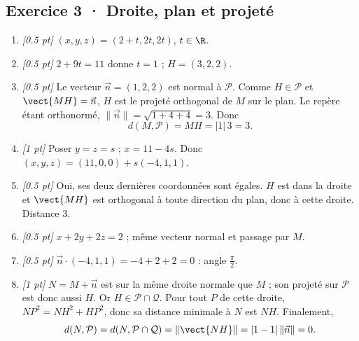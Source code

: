 \subsection*{Exercice 3 · Droite, plan et projeté}\begin{enumerate}

\item \textit{[\num{0,5} pt]} $(x,y,z)=(2+t,2t,2t)$, $t\in\R$.

\item \textit{[\num{0,5} pt]} $2+9t=11$ donne $t=1$ ; $H=(3,2,2)$.

\item \textit{[\num{0,5} pt]} Le vecteur $\vec n=(1,2,2)$ est normal à $\mathcal P$. Comme $H\in\mathcal P$ et $\vect{MH}=\vec n$, $H$ est le projeté orthogonal de $M$ sur le plan. Le repère étant orthonormé, $\|\vec n\|=\sqrt{1+4+4}=3$. Donc
\[d(M,\mathcal P)=MH=|1|\,3=3.\]

\item \textit{[1 pt]} Poser $y=z=s$ ; $x=11-4s$. Donc $(x,y,z)=(11,0,0)+s(-4,1,1)$.

\item \textit{[\num{0,5} pt]} Oui, ses deux dernières coordonnées sont égales. $H$ est dans la droite et $\vect{MH}$ est orthogonal à toute direction du plan, donc à cette droite. Distance $3$.

\item \textit{[\num{0,5} pt]} $x+2y+2z=2$ ; même vecteur normal et passage par $M$.

\item \textit{[\num{0,5} pt]} $\vec n\cdot(-4,1,1)=-4+2+2=0$ : angle $\frac{\pi}{2}$.

\item \textit{[1 pt]} $N=M+\vec n$ est sur la même droite normale que $M$ ; son projeté sur $\mathcal P$ est donc aussi $H$. Or $H\in\mathcal P\cap\mathcal Q$. Pour tout $P$ de cette droite, $NP^2=NH^2+HP^2$, donc sa distance minimale à $N$ est $NH$. Finalement,
\[d(N,\mathcal P)=d(N,\mathcal P\cap\mathcal Q)=\|\vect{NH}\|=|1-1|\,\|\vec n\|=0.\]

\end{enumerate}

